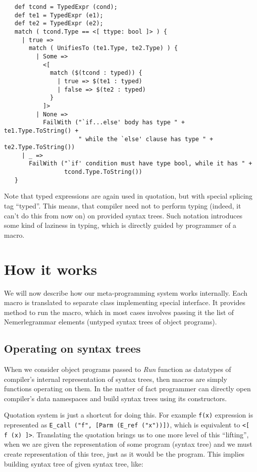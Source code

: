 \documentclass{llncs}
\newcommand{\nem}[0]{Nemerle}
\begin{document}
\begin{verbatim}
   def tcond = TypedExpr (cond);
   def te1 = TypedExpr (e1);
   def te2 = TypedExpr (e2);
   match ( tcond.Type == <[ ttype: bool ]> ) {
     | true =>
       match ( UnifiesTo (te1.Type, te2.Type) ) {
         | Some =>
           <[ 
             match ($(tcond : typed)) { 
               | true => $(te1 : typed) 
               | false => $(te2 : typed) 
             } 
           ]>
         | None =>
           FailWith ("`if...else' body has type " + te1.Type.ToString() + 
                     " while the `else' clause has type " + te2.Type.ToString())
     | _ =>
       FailWith ("`if' condition must have type bool, while it has " + 
                 tcond.Type.ToString())
   }
\end{verbatim}

Note that typed expressions are again used in quotation, but with special 
splicing tag ``typed''. This means, that compiler need not to perform typing
(indeed, it can't do this from now on) on provided syntax trees. Such notation
introduces some kind of laziness in typing, which is directly guided by
programmer of a macro.

\section{How it works}
We will now describe how our meta-programming system works internally. Each
macro is translated to separate class implementing special interface. 
It provides method to run the macro, which in most cases involves passing
it the list of \nem grammar elements (untyped syntax trees of object 
programs). 

\subsection{Operating on syntax trees}
When we consider object programs passed to \emph{Run} function as datatypes
of compiler's internal representation of syntax trees, then macros are 
simply functions operating on them. In the matter of fact programmer can
directly open compiler's data namespaces and build syntax trees using its
constructors. 

Quotation system is just a shortcut for doing this. For example \verb,f(x),
expression is represented as \verb.E_call ("f", [Parm (E_ref ("x"))]).,
which is equivalent to \verb,<[ f (x) ]>,. Translating the quotation brings
us to one more level of this ``lifting'', when we are given the representation
of some program (syntax tree) and we must create representation of this tree,
just as it would be the program. This implies building syntax tree of given
syntax tree, like:
\end{document}
